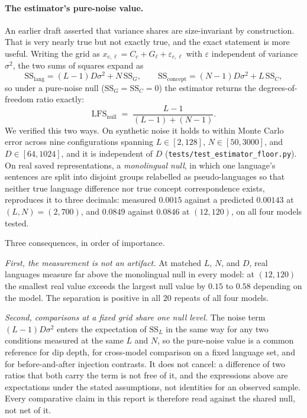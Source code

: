\documentclass[11pt,a4paper]{article}
\begin{document}
\paragraph{The estimator's pure-noise value.} An earlier draft asserted
that variance shares are size-invariant by construction. That is very
nearly true but not exactly true, and the exact statement is more useful.
Writing the grid as $x_{c,\ell} = C_c + G_\ell + \varepsilon_{c,\ell}$ with
$\varepsilon$ independent of variance $\sigma^2$, the two sums of squares
expand as
\[
\mathrm{SS}_{\mathrm{lang}} = (L-1)D\sigma^2 + N\,\mathrm{SS}_G,
\qquad
\mathrm{SS}_{\mathrm{concept}} = (N-1)D\sigma^2 + L\,\mathrm{SS}_C ,
\]
so under a pure-noise null ($\mathrm{SS}_G = \mathrm{SS}_C = 0$) the
estimator returns the degrees-of-freedom ratio exactly:
\[
\mathrm{LFS}_{\mathrm{null}} \;=\; \frac{L-1}{(L-1) + (N-1)} .
\]
We verified this two ways. On synthetic noise it holds to within Monte
Carlo error across nine configurations spanning $L \in [2, 128]$,
$N \in [50, 3000]$, and $D \in [64, 1024]$, and it is independent of $D$
(\texttt{tests/test\_estimator\_floor.py}). On real saved representations,
a \emph{monolingual null}, in which one language's sentences are split into
disjoint groups relabelled as pseudo-languages so that neither true
language difference nor true concept correspondence exists, reproduces it
to three decimals: measured $0.0015$ against a predicted $0.00143$ at
$(L, N) = (2, 700)$, and $0.0849$ against $0.0846$ at $(12, 120)$, on all
four models tested.

Three consequences, in order of importance.

\emph{First, the measurement is not an artifact.} At matched $L$, $N$, and
$D$, real languages measure far above the monolingual null in every model:
at $(12, 120)$ the smallest real value exceeds the largest null value by
$0.15$ to $0.58$ depending on the model. The separation is positive in all
$20$ repeats of all four models.

\emph{Second, comparisons at a fixed grid share one null level.} The noise
term $(L-1)D\sigma^2$ enters the expectation of $\mathrm{SS}_L$ in the same
way for any two conditions measured at the same $L$ and $N$, so the
pure-noise value is a common reference for dip depth, for cross-model
comparison on a fixed language set, and for before-and-after injection
contrasts. It does not cancel: a difference of two ratios that both carry the
term is not free of it, and the expressions above are expectations under the
stated assumptions, not identities for an observed sample. Every comparative
claim in this report is therefore read against the shared null, not net of
it.
\end{document}
